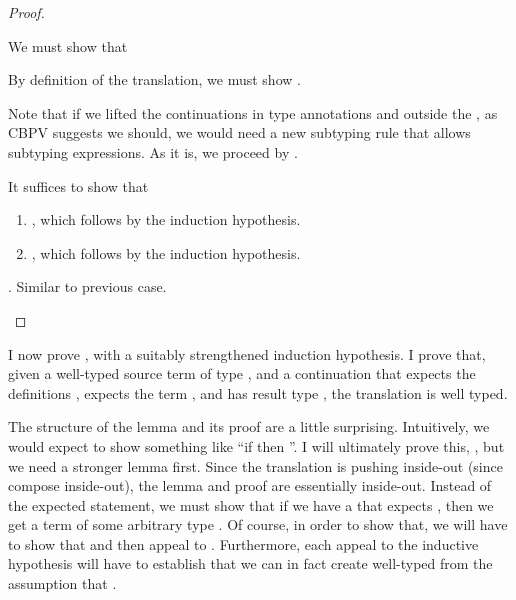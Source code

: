 {\begin{proof}
\begin{proofcases}
      We must show that
      \im{\ssubtyjudg{\anfh{\slenv}}{\anfh{\spity{\sxone}{\sAone}{\sBone}}}{\anfh{\spity{\sxtwo}{\sAtwo}{\sBtwo}}}}

      By definition of the translation, we must show \im{\ssubtyjudg{\anfh{\slenv}}{\tpity{\txone}{\anfh{\sAone}}{\anfh{\sBone}}}{\tpity{\txtwo}{\anfh{\sAtwo}}{\anfh{\sBtwo}}}}.

      Note that if we lifted the continuations in type annotations \im{\sAone} and
      \im{\sAtwo} outside the \tfonttext{\im{\Pi}}, as CBPV suggests we should, we
      would need a new subtyping rule that allows subtyping 
      expressions.
      As it is, we proceed by .

      It suffices to show that
      \begin{enumerate}
        \item \im{\sequivjudg{\anfh{\slenv}}{\anfh{\sAone}}{\anfh{\sAtwo}}}, which follows by the induction hypothesis.
        \item \im{\ssubtyjudg{\anfh{\slenv},\txone:\anfh{\sAtwo}}{\anfh{\sBone}}{\subst{\anfh{\sBtwo}}{\txone}{\txtwo}}}, which follows by the induction hypothesis.
      \end{enumerate}
    \item {}. Similar to previous case.
  \end{proofcases}
\end{proof}

I now prove , with a suitably strengthened induction
hypothesis.
I prove that, given a well-typed source term \im{\se} of type \im{\sA}, and a
continuation \im{\tK} that expects the definitions \im{\edefs{\se}}, expects the
term \im{\ehole{\se}}, and has result type \im{\tB}, the
translation \im{\anf{\se}{\tK}} is well typed.

The structure of the lemma and its proof are a little surprising.
Intuitively, we would expect to show something like ``if \im{\se : \sA} then
\im{\anfh{\se} : \anfh{\sA}}''.
I will ultimately prove this, , but we need a
stronger lemma first.
Since the translation is pushing  inside-out (since
 compose inside-out), the  lemma and proof
are essentially inside-out.
Instead of the expected statement, we must show that if we have a
 \im{\tK} that expects \im{\anfh{\se} : \anfh{\sA}}, then we get a
term \im{\anf{\se}{\tK}} of some arbitrary type \im{\tB}.
Of course, in order to show that, we will have to show that
\im{\anfh{\se} : \anfh{\sA}} and then appeal to .
Furthermore, each appeal to the inductive hypothesis will have to establish that
we can in fact create well-typed  from the assumption that \im{\anfh{\se}
  : \anfh{\sA}}.

}
